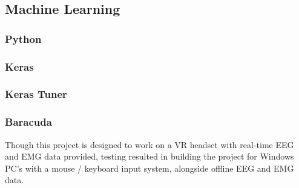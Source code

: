 \documentclass[11pt, a4paper]{article}
\begin{document}
\subsection{Machine Learning}	
\subsubsection{Python}	
\subsubsection{Keras}	
\subsubsection{Keras Tuner}
\subsubsection{Baracuda}	





Though this project is designed to work on a VR headset with real-time EEG and EMG data provided, testing resulted in building the project for Windows PC's with a mouse / keyboard input system, alongside offline EEG and EMG data.  
\end{document}
